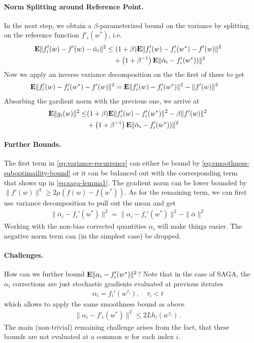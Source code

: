 \documentclass{article}
\newcommand{\E}{{\bf E}}
\newcommand{\w}{w}
\begin{document}
\paragraph{Norm Splitting around Reference Point.} In the next step, we obtain a $\beta$-parameterized bound on the variance by splitting on the reference function $f'_i(w^*)$, i.e.  
\begin{align}
 \E \| f'_i(w) - f'(w) - \bar \alpha_i  \|^2  \leq & \; (1+\beta) \E \| f'_i(w) - f'_i(w^*) - f'(w) \|^2 \\
& + \left(1+ \beta^{-1} \right) \E \| \bar \alpha_i - f_i'(w^*) )\|^2
\nonumber
\end{align} 
Now we apply an inverse variance decomposition on the the first of these to get 
\begin{align}
&  \E \| f'_i(w) - f'_i(w^*) - f'(w) \|^2  =   \E \| f'_i(w) - f'_i(w^*)  \|^2 -  \| f'(w)\|^2
\end{align}
Absorbing the gardient norm with the previous one, we arrive at 
\begin{align}
\E \|g_i(w)\|^2 \leq & (1+\beta) \E \| f'_i(w) - f'_i(w^*) \|^2  - \beta \| f'(w) \|^2 \nonumber \\
& + \left(1+ \beta^{-1} \right) \E \| \bar \alpha_i - f_i'(w^*) )\|^2
\label{eq:variance-recurrence}
\end{align}
%

\paragraph{Further Bounds.} The first term in \eqref{eq:variance-recurrence} can either be bound by \eqref{eq:smoothness-suboptimaility-bound} or it can be balanced out with the corresponding term that shows up in \eqref{eq:saga-lemma1}. 
%
The gradient norm can be lower bounded by $\| f'(w) \|^2 \ge 2 \mu \left( f(w) - f(w^*) \right)$. 
%
As for the remaining term, we can first use variance decomposition to pull out the mean and get  
\begin{align}
 \| \bar\alpha_i - f_i'(w^*) \|^2 = \| \alpha_i - f_i'(w^*) \|^2 - \| \bar \alpha \|^2 
\end{align}
Working with the non-bias corrected quantities $\alpha_i$ will make things easier. The negative norm term can (in the simplest case) be dropped. 

\paragraph{Challenges.}
How can we further bound  $\E \| \alpha_i - f_i'(w^*) \|^2$? Note that in the case of SAGA, the $\alpha_i$ corrections are just stochastic gradients evaluated at previous iterates 
\begin{align}
\alpha_i = f_i'(w^{\tau_i}), \quad \tau_i < t
\end{align}
which allows to apply the same smoothness bound  as above 
\begin{align}
\| \alpha_i-f'_i(w^*)\|^2 \le 2L  h_i(w^{\tau_i}) \,.
\label{eq:alpha-bound}
\end{align}
The main (non-trivial) remaining challenge arises from the fact, that these bounds are not evaluated at a common $\w$ for each index $i$. 
\end{document}
